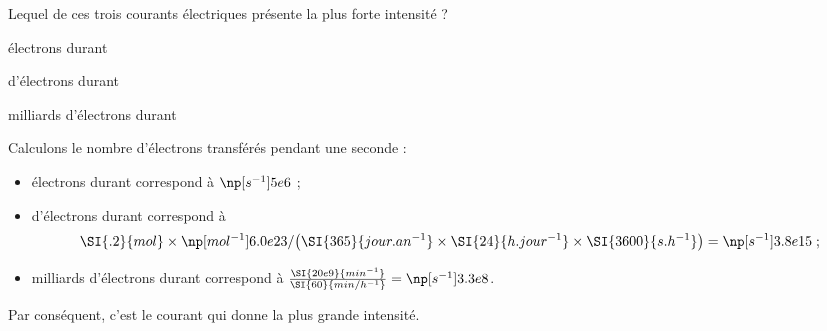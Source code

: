 





\hauteurLargeurCadreReponse		{6mm}{1.5cm}
\initialisationEntrainement

\debutEntrainement

\begin{enonce}
Lequel de ces trois courants électriques présente la plus forte intensité ?
	
	\begin{listeQCM2Colonnes}
	\item {} électrons durant  
	\item {} d'électrons durant  
	\item {} milliards d'électrons durant  
	\end{listeQCM2Colonnes}
	\medskip
\end{enonce}

\reponse{\reponseB{}}

\begin{corrige}
	Calculons le nombre d'électrons transférés pendant une seconde : 
	\begin{itemize}
	\item {} électrons durant  correspond à $\np[s^{-1}]{5e6}$ ;
	\item {} d'électrons durant  correspond à 
	\[
	\SI{.2}{mol}\times\np[mol^{-1}]{6.0e23}/\big(\SI{365}{jour.an^{-1}}\times \SI{24}{h.jour^{-1}}\times\SI{3600}{s.h^{-1}}\big)=\np[s^{-1}]{3.8e15}\; ;
	\] 
	\item {} milliards d'électrons durant  correspond à $\frac{\SI{20e9}{min^{-1}}}{\SI{60}{min/h^{-1}}}=\np[s^{-1}]{3.3e8}$.
	\end{itemize}
	Par conséquent, c'est le courant \reponseB{} qui donne la plus grande intensité.
\end{corrige}

